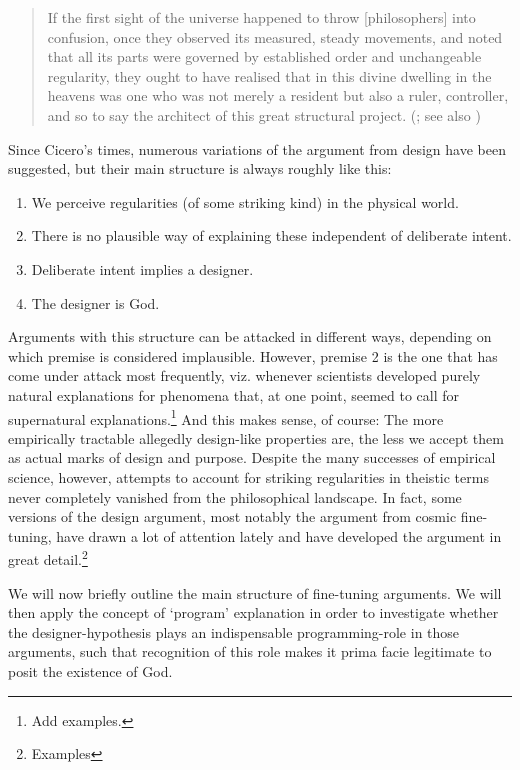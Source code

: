 \documentclass[a4paper,12pt]{article}
\begin{document}
\blockquote{If the first sight of the universe happened to throw [philosophers] into confusion, once they observed its measured, steady movements, and noted that all its parts were governed by established order and unchangeable regularity, they ought to have realised that in this divine dwelling in the heavens was one who was not merely a resident but also a ruler, controller, and so to say the architect of this great structural project. (\citealp[II.90,~p.~79]{Cicero1998}; see also \citealp[p.~37]{Jantzen2014})}


Since Cicero's times, numerous variations of the argument from design have been suggested, but their main structure is always roughly like this:

\begin{enumerate}[noitemsep]
\item We perceive regularities (of some striking kind) in the physical world.
\item There is no plausible way of explaining these independent of deliberate intent.
\item Deliberate intent implies a designer.
\item The designer is God.
\end{enumerate}

Arguments with this structure can be attacked in different ways, depending on which premise is considered implausible. However, premise 2 is the one that has come under attack most frequently, viz. whenever scientists developed purely natural explanations for phenomena that, at one point, seemed to call for supernatural explanations.\footnote{Add examples.} And this makes sense, of course: The more empirically tractable allegedly design-like properties are, the less we accept them as actual marks of design and purpose. Despite the many successes of empirical science, however, attempts to account for striking regularities in theistic terms never completely vanished from the philosophical landscape. In fact, some versions of the design argument, most notably the argument from cosmic fine-tuning, have drawn a lot of attention lately and have developed the argument in great detail.\footnote{Examples}

We will now briefly outline the main structure of fine-tuning arguments. We will then apply the concept of `program' explanation in order to investigate whether the designer-hypothesis plays an indispensable programming-role in those arguments, such that recognition of this role makes it prima facie legitimate to posit the existence of God.
\end{document}
